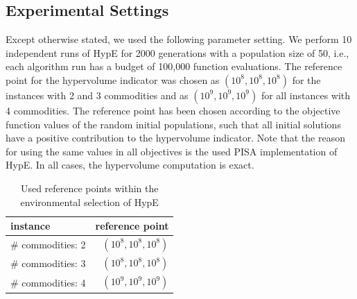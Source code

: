 \documentclass[preprint,12pt]{elsarticle}
\begin{document}

\subsection{Experimental Settings}
Except otherwise stated, we used the following parameter setting. We perform 10 independent runs of HypE for 2000 generations with a population size of 50, i.e., each algorithm run has a budget of 100,000 function evaluations. The reference point for the hypervolume indicator was chosen as $(10^8, 10^8, 10^8)$ for the instances with 2 and 3 commodities and as $(10^9, 10^9, 10^9)$ for all instances with 4 commodities. The reference point has been chosen according to the objective function values of the random initial populations, such that all initial solutions have a positive contribution to the hypervolume indicator. Note that the reason for using the same values in all objectives is the used PISA implementation of HypE. In all cases, the hypervolume computation is exact.

\begin{table}
\centering
\caption{\label{tab:referencepoints} Used reference points within the environmental selection of HypE}
\vspace{1em}
\begin{tabular}{lr}
	\toprule
	instance & reference point\\ \midrule
	\# commodities: 2 & $(10^8, 10^8, 10^8)$\\
	\# commodities: 3 & $(10^8, 10^8, 10^8)$\\
	\# commodities: 4 & $(10^9, 10^9, 10^9)$\\
	\bottomrule
\end{tabular}
\end{table}
\end{document}
